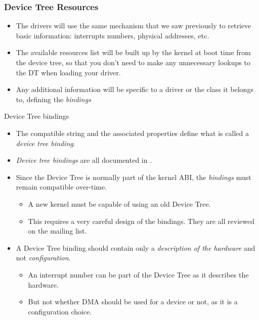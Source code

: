 \begin{frame}
  \frametitle{Device Tree Resources}
  \begin{itemize}
  \item The drivers will use the same mechanism that we saw previously
    to retrieve basic information: interrupts numbers, physical
    addresses, etc.
  \item The available resources list will be built up by the kernel at
    boot time from the device tree, so that you don't need to make any
    unnecessary lookups to the DT when loading your driver.
  \item Any additional information will be specific to a driver or
    the class it belongs to, defining the {\em bindings}
  \end{itemize}
\end{frame}

\begin{frame}{Device Tree bindings}
  \begin{itemize}
  \item The compatible string and the associated properties define
    what is called a {\em device tree binding}.
  \item {\em Device tree bindings} are all documented in
    .
  \item Since the Device Tree is normally part of the kernel ABI, the
    {\em bindings} must remain compatible over-time.
    \begin{itemize}
    \item A new kernel must be capable of using an old Device Tree.
    \item This requires a very careful design of the bindings. They
      are all reviewed on the 
      mailing list.
    \end{itemize}
  \item A Device Tree binding should contain only a {\em description
      of the hardware} and not {\em configuration}.
    \begin{itemize}
    \item An interrupt number can be part of the Device Tree as it
      describes the hardware.
    \item But not whether DMA should be used for a device or not,
      as it is a configuration choice.
    \end{itemize}
  \end{itemize}
\end{frame}

